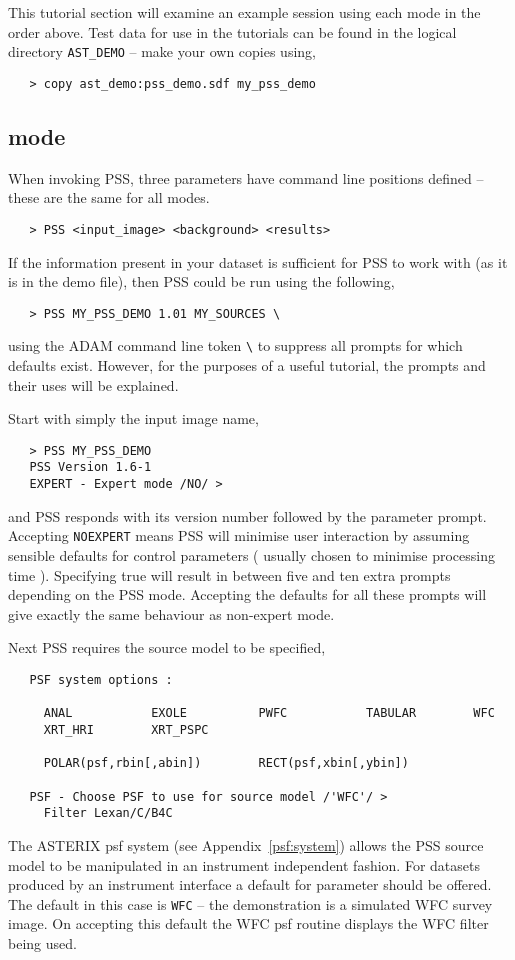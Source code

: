 This tutorial section will examine an example session using 
each mode in the order above. Test data for use in the tutorials
can be found in
the logical directory \verb+AST_DEMO+ -- make your own copies using,
\begin{verbatim}
   > copy ast_demo:pss_demo.sdf my_pss_demo
\end{verbatim}

\subsection{ mode}
\label{pss:tut:search}
When invoking PSS, three parameters have command line positions defined --
these are the same for all modes.
\begin{verbatim}
   > PSS <input_image> <background> <results>
\end{verbatim}
If the information present in your dataset is sufficient for PSS to
work with (as it is in the demo file), then PSS could be run using 
the following,
\begin{verbatim}
   > PSS MY_PSS_DEMO 1.01 MY_SOURCES \
\end{verbatim}
using the ADAM command line token \verb+\+ to suppress all 
prompts for which defaults exist. However, for the purposes
of a useful tutorial, the prompts
and their uses will be explained.

Start with simply the input image name,
\begin{verbatim}
   > PSS MY_PSS_DEMO
   PSS Version 1.6-1
   EXPERT - Expert mode /NO/ > 
\end{verbatim}
and PSS responds with its version number followed by the 
parameter prompt.
Accepting \verb+NOEXPERT+ means PSS will minimise user interaction by assuming
sensible defaults for control parameters ( usually chosen to minimise 
processing time ). Specifying \apar{EXPERT} true will result in between
five and ten extra prompts depending on the PSS mode. Accepting the
defaults for
all these prompts will give exactly the same behaviour as non-expert mode.

Next PSS requires the source model to be specified,
\begin{verbatim}
   PSF system options :

     ANAL           EXOLE          PWFC           TABULAR        WFC
     XRT_HRI        XRT_PSPC

     POLAR(psf,rbin[,abin])        RECT(psf,xbin[,ybin])

   PSF - Choose PSF to use for source model /'WFC'/ > 
     Filter Lexan/C/B4C
\end{verbatim}
The ASTERIX psf system (see Appendix~\ref{psf:system}) allows the PSS
source model to be manipulated in an instrument
independent fashion. For datasets produced by an
instrument interface a default for  parameter should be
offered. The default in this case is \verb+WFC+ -- the demonstration is
a simulated WFC survey image. On accepting this default the WFC psf
routine displays the WFC filter being used.

